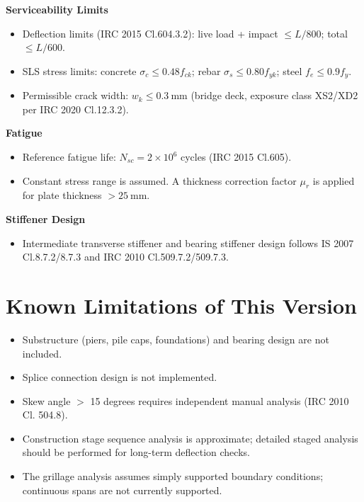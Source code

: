 \documentclass[12pt,a4paper]{report}
\numberwithin{table}{chapter}
\numberwithin{figure}{chapter}
\begin{document}
\textbf{Serviceability Limits}

\begin{itemize}
\item Deflection limits (IRC 2015 Cl.604.3.2): live load + impact $\leq L/800$; total $\leq L/600$.
\item SLS stress limits: concrete $\sigma_c \leq 0.48 f_{ck}$; rebar $\sigma_s \leq 0.80 f_{yk}$; steel $f_e \leq 0.9 f_y$.
\item Permissible crack width: $w_k \leq 0.3 \ \text{mm}$ (bridge deck, exposure class XS2/XD2 per IRC 2020 Cl.12.3.2).
\end{itemize}

\textbf{Fatigue}

\begin{itemize}
\item Reference fatigue life: $N_{sc} = 2 \times 10^6$ cycles (IRC 2015 Cl.605).
\item Constant stress range is assumed. A thickness correction factor $\mu_r$ is applied for plate thickness $> 25 \ \text{mm}$.
\end{itemize}

\textbf{Stiffener Design}

\begin{itemize}
\item Intermediate transverse stiffener and bearing stiffener design follows IS 2007 Cl.8.7.2/8.7.3 and IRC 2010 Cl.509.7.2/509.7.3.
\end{itemize}

\section{Known Limitations of This Version}
\label{sec:limitations}

\begin{itemize}
\item Substructure (piers, pile caps, foundations) and bearing design are not included.
\item Splice connection design is not implemented.
\item Skew angle $>$ 15 degrees requires independent manual analysis (IRC 2010 Cl. 504.8).
\item Construction stage sequence analysis is approximate; detailed staged analysis
  should be performed for long-term deflection checks.
\item The grillage analysis assumes simply supported boundary conditions;
  continuous spans are not currently supported.
\end{itemize}
\end{document}
